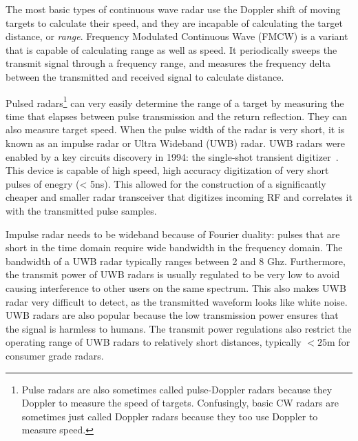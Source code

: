 \documentclass[12pt]{article}
\begin{document}
The most basic types of continuous wave radar use the Doppler shift of
moving targets to calculate their speed, and they are incapable of
calculating the target distance, or \emph{range}. Frequency Modulated
Continuous Wave (FMCW) is a variant that is capable of calculating
range as well as speed. It periodically sweeps the transmit signal
through a frequency range, and measures the frequency delta between
the transmitted and received signal to calculate distance.

Pulsed radars\footnote{Pulse radars are also sometimes called
  pulse-Doppler radars because they Doppler to measure the speed of
  targets. Confusingly, basic CW radars are sometimes just called
  Doppler radars because they too use Doppler to measure speed.} can
very easily determine the range of a target by measuring the time that
elapses between pulse transmission and the return reflection. They can
also measure target speed. When the pulse width of the radar is very
short, it is known as an impulse radar or Ultra Wideband (UWB)
radar. UWB radars were enabled by a key circuits discovery in 1994:
the single-shot transient digitizer~\cite{}. This device is capable of
high speed, high accuracy digitization of very short pulses of enegry
(< 5ns). This allowed for the construction of a significantly cheaper
and smaller radar transceiver that digitizes incoming RF and
correlates it with the transmitted pulse samples. 

Impulse radar needs to be wideband because of Fourier duality:
pulses that are short in the time domain require wide bandwidth in the
frequency domain. The bandwidth of a UWB radar typically ranges
between 2 and 8 Ghz. Furthermore, the transmit power of UWB radars is
usually regulated to be very low to avoid causing interference to
other users on the same spectrum. This also makes UWB radar very
difficult to detect, as the transmitted waveform looks like white
noise. UWB radars are also popular because the low transmission power
ensures that the signal is harmless to humans. The transmit power
regulations also restrict the operating range of UWB radars to
relatively short distances, typically $<25$m for consumer grade
radars.

\end{document}
